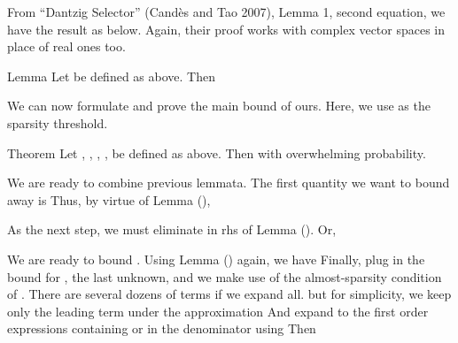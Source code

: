 From ``Dantzig Selector'' (Cand\`es and Tao 2007), Lemma 1, second equation, we have the result as below.
Again, their proof works with complex vector spaces in place of real ones too.

\Result
{Lemma}
{
Let  be defined as above.
Then
%
%
}

\startsection [title={The Main Bound}]

We can now formulate and prove the main bound of ours.
Here, we use  as the sparsity threshold.

\Result
{Theorem}
{
Let , , , ,  be defined as above.
Then
with overwhelming probability.
}

We are ready to combine previous lemmata.
The first quantity we want to bound away is
Thus, by virtue of Lemma (),

As the next step, we must eliminate  in rhs of Lemma ().
Or,

We are ready to bound .
Using Lemma () again, we have
Finally, plug in the bound for , the last unknown, and we make use of the almost-sparsity condition of .
There are several dozens of terms if we expand all.
but for simplicity, we keep only the leading term under the approximation
And expand to the first order expressions containing  or  in the denominator using
Then


\color[red]{(To be done)}

\stopchapter
